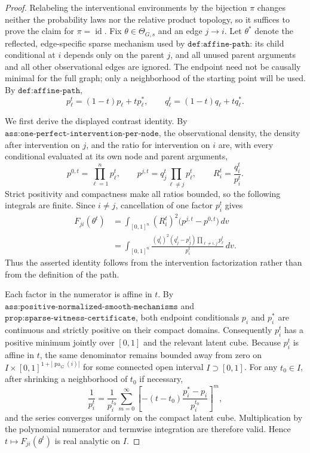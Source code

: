 \documentclass{article}
\begin{document}
\begin{proof}
Relabeling the interventional environments by the bijection \(\pi\) changes neither the probability laws nor the relative product topology, so it suffices to prove the claim for \(\pi=\operatorname{id}\). Fix \(\theta\in\Theta_{G,s}\) and an edge \(j\to i\). Let \(\theta^*\) denote the reflected, edge-specific sparse mechanism used by \(\texttt{def:affine-path}\): its child conditional at \(i\) depends only on the parent \(j\), and all unused parent arguments and all other observational edges are ignored. The endpoint need not be causally minimal for the full graph; only a neighborhood of the starting point will be used. By \(\texttt{def:affine-path}\),
\[
 p_\ell^t=(1-t)p_\ell+t p_\ell^*,
 \qquad
 q_\ell^t=(1-t)q_\ell+t q_\ell^*.
\]

We first derive the displayed contrast identity. By \(\texttt{ass:one-perfect-intervention-per-node}\), the observational density, the density after intervention on \(j\), and the ratio for intervention on \(i\) are, with every conditional evaluated at its own node and parent arguments,
\[
 p^{0,t}=\prod_{\ell=1}^n p_\ell^t,
 \qquad
 p^{j,t}=q_j^t\prod_{\ell\ne j}p_\ell^t,
 \qquad
 R_i^t=\frac{q_i^t}{p_i^t}.
\]
Strict positivity and compactness make all ratios bounded, so the following integrals are finite. Since \(i\ne j\), cancellation of one factor \(p_i^t\) gives
\[
\begin{aligned}
 F_{ji}(\theta^t)
 &=\int_{[0,1]^n}(R_i^t)^2\bigl(p^{j,t}-p^{0,t}\bigr)\,dv\\
 &=\int_{[0,1]^n}
   \frac{(q_i^t)^2(q_j^t-p_j^t)
   \prod_{\ell\ne i,j}p_\ell^t}{p_i^t}\,dv.
\end{aligned}
\]
Thus the asserted identity follows from the intervention factorization rather than from the definition of the path.

Each factor in the numerator is affine in \(t\). By \(\texttt{ass:positive-normalized-smooth-mechanisms}\) and \(\texttt{prop:sparse-witness-certificate}\), both endpoint conditionals \(p_i\) and \(p_i^*\) are continuous and strictly positive on their compact domains. Consequently \(p_i^t\) has a positive minimum jointly over \([0,1]\) and the relevant latent cube. Because \(p_i^t\) is affine in \(t\), the same denominator remains bounded away from zero on \(I\times[0,1]^{1+|\operatorname{pa}_G(i)|}\) for some connected open interval \(I\supset[0,1]\). For any \(t_0\in I\), after shrinking a neighborhood of \(t_0\) if necessary,
\[
 \frac{1}{p_i^t}
 =\frac{1}{p_i^{t_0}}
  \sum_{m=0}^{\infty}
  \left[-(t-t_0)\frac{p_i^*-p_i}{p_i^{t_0}}\right]^m,
\]
and the series converges uniformly on the compact latent cube. Multiplication by the polynomial numerator and termwise integration are therefore valid. Hence \(t\mapsto F_{ji}(\theta^t)\) is real analytic on \(I\).


\end{proof}
\end{document}
